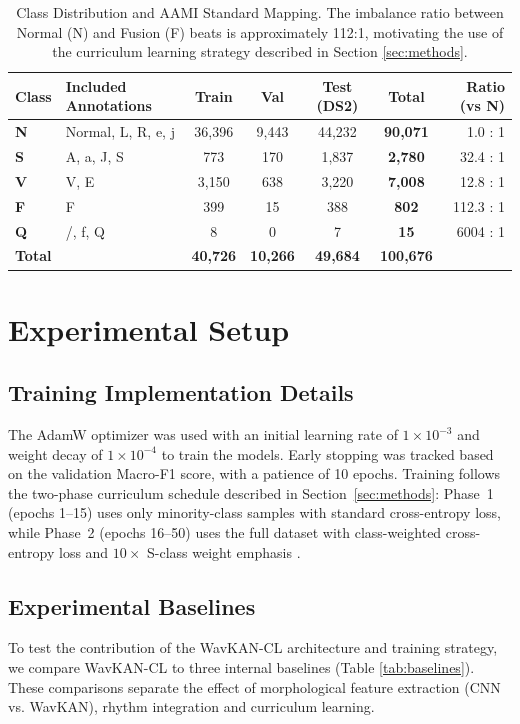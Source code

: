 \documentclass[pdflatex,sn-mathphys-num]{sn-jnl}
\theoremstyle{thmstyleone}
\theoremstyle{thmstyletwo}
\theoremstyle{thmstylethree}
\begin{document}
\begin{table}[ht]
\caption{Class Distribution and AAMI Standard Mapping. The imbalance ratio between Normal (N) and Fusion (F) beats is approximately 112:1, motivating the use of the curriculum learning strategy described in Section \ref{sec:methods}.}
\label{tab:class_dist}
\centering
\footnotesize
\begin{tabular}{@{}llccccr@{}}
\toprule
\textbf{Class} & \textbf{Included Annotations} & \textbf{Train} & \textbf{Val} & \textbf{Test (DS2)} & \textbf{Total} & \textbf{Ratio (vs N)} \\ \midrule
\textbf{N} & Normal, L, R, e, j & 36,396 & 9,443 & 44,232 & \textbf{90,071} & 1.0 : 1 \\
\textbf{S} & A, a, J, S & 773 & 170 & 1,837 & \textbf{2,780} & 32.4 : 1 \\
\textbf{V} & V, E & 3,150 & 638 & 3,220 & \textbf{7,008} & 12.8 : 1 \\
\textbf{F} & F & 399 & 15 & 388 & \textbf{802} & 112.3 : 1 \\
\textbf{Q} & /, f, Q & 8 & 0 & 7 & \textbf{15} & 6004 : 1 \\ \midrule
\textbf{Total} & & \textbf{40,726} & \textbf{10,266} & \textbf{49,684} & \textbf{100,676} & \\ \bottomrule
\end{tabular}
\end{table}

\section{Experimental Setup}

\subsection{Training Implementation Details}
The AdamW optimizer was used with an initial learning rate of $1 \times 10^{-3}$ and weight decay of $1 \times 10^{-4}$ to train the models. Early stopping was tracked based on the validation Macro-F1 score, with a patience of 10 epochs. Training follows the two-phase curriculum schedule described in Section~\ref{sec:methods}: Phase~1 (epochs 1--15) uses only minority-class samples with standard cross-entropy loss, while Phase~2 (epochs 16--50) uses the full dataset with class-weighted cross-entropy loss and $10\times$ S-class weight emphasis \cite{schmale_curriculum_2025}.

\subsection{Experimental Baselines}
To test the contribution of the WavKAN-CL architecture and training strategy, we compare WavKAN-CL to three internal baselines (Table \ref{tab:baselines}). These comparisons separate the effect of morphological feature extraction (CNN vs. WavKAN), rhythm integration and curriculum learning.
\end{document}
